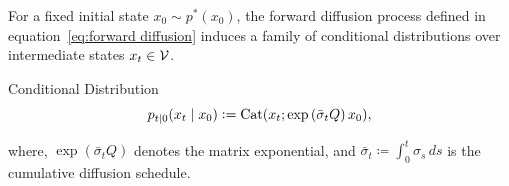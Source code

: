   For a fixed initial state $x_0 \sim p^*(x_0)$, the forward diffusion process defined in equation~\eqref{eq:forward diffusion} induces a family of conditional distributions over intermediate states $x_t \in \mathcal{V}$.
  \begin{Box1}{Conditional Distribution}
    \begin{equation}
      p_{t \mid 0}(x_t \mid x_0) \vcentcolon= \text{Cat}(x_t; \exp\left(\bar{\sigma}_t Q\right)x_0 ), 
    \label{eq:conditional_distribution}
    \end{equation}
  \end{Box1}
  where, $\exp\left(\bar{\sigma}_t Q\right)$ denotes the matrix exponential, and $\bar{\sigma}_t \coloneqq \int_{0}^{t} \sigma_s \, ds$ is the cumulative diffusion schedule. 

